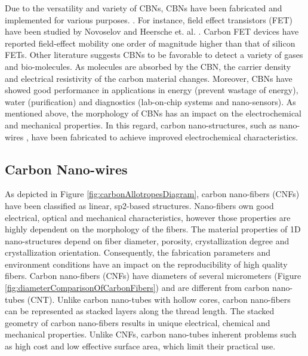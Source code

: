 Due to the versatility and variety of CBNs, CBNs have been fabricated and implemented for various purposes. \cite{Geim2011, Katsnelson2008, Li2008, Geim2007, Geim2009, Siddiqui2019}. For instance, field effect transistors (FET) have been studied by Novoselov \cite{Novoselov2004} and Heersche et. al. \cite{Heersche2007}. Carbon FET devices have reported field-effect mobility one order of magnitude higher than that of silicon FETs. Other literature suggests CBNs to be favorable to detect a variety of gases and bio-molecules. \cite{Schedin2007, Ohno2009} As molecules are absorbed by the CBN, the carrier density and electrical resistivity of the carbon material changes. Moreover, CBNs have showed good performance in applications in energy (prevent wastage of energy), water (purification) and diagnostics (lab-on-chip systems and nano-sensors). \cite{Cao2011, Khanna2016} As mentioned above, the morphology of CBNs has an impact on the electrochemical and mechanical properties. \cite{Marsh1989, Hugh1994, Guo2018} In this regard, carbon nano-structures, such as nano-wires \cite{Kundu2019, Bencheikh2019, Bencheikh2019}, have been fabricated to achieve improved electrochemical characteristics.

\subsection{Carbon Nano-wires}

As depicted in Figure \ref{fig:carbonAllotropesDiagram}, carbon nano-fibers (CNFs) have been classified as linear, sp2-based structures. \cite{Heersche2007, Heimann1997, Belenkov2003, Fedel2013, Razeghi2019, AlstrupJensen2015, Vajtai2013} Nano-fibers own good electrical, optical and mechanical characteristics, however those properties are highly dependent on the morphology of the fibers. \cite{Dresselhaus2007} The material properties of 1D nano-structures depend on fiber diameter, porosity, crystallization degree and crystallization orientation. Consequently, the fabrication parameters and environment conditions have an impact on the reproducibility of high quality fibers. \cite{Dresselhaus2007} Carbon nano-fibers (CNFs) have diameters of several micrometers (Figure \ref{fig:diameterComparisonOfCarbonFibers}) and are different from carbon nano-tubes (CNT). \cite{Weil1992, Huang2009, chung2012carbon, Subramoney1997, Dresselhaus2000} Unlike carbon nano-tubes with hollow cores, carbon nano-fibers can be represented as stacked layers along the thread length. \cite{Dresselhaus2000, Rodriguez1993, Yoon2004} The stacked geometry of carbon nano-fibers results in unique electrical, chemical and mechanical properties. \cite{Liu2009, Endo2003, Yokozeki2009} Unlike CNFs, carbon nano-tubes inherent problems such as high cost and low effective surface area, which limit their practical use. \cite{Vajtai2013}

